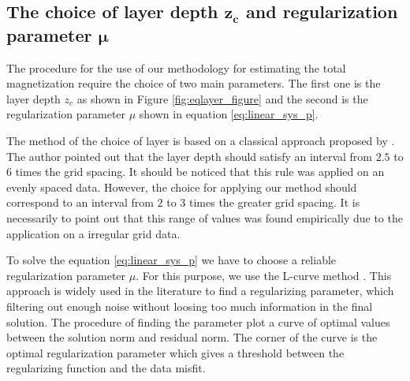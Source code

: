 \subsection{The choice of layer depth $\mathbf{z_{c}}$ and regularization parameter $\mathbf{\mu}$}

The procedure for the use of our methodology for estimating the total magnetization require the choice of two main parameters. The first one is the layer depth $z_c$ as shown in Figure \ref{fig:eqlayer_figure} and the second is the regularization parameter $\mu$ shown in equation \ref{eq:linear_sys_p}.

The method of the choice of layer is based on a classical approach proposed by \cite{dampney1969}. The author pointed out that the layer depth should satisfy an interval from $2.5$ to $6$ times the grid spacing. It should be noticed that this rule was applied on an evenly spaced data. However, the choice for applying our method should correspond to an interval from $2$ to $3$ times the greater grid spacing. It is necessarily to point out that this range of values was found empirically due to the application on a irregular grid data.

To solve the equation \ref{eq:linear_sys_p} we have to choose a reliable regularization parameter $\mu$. For this purpose, we use the L-curve method \citep{hansen1992}. This approach is widely used in the literature to find a regularizing parameter, which filtering out enough noise without loosing too much information in the final solution. The procedure of finding the parameter plot a curve of optimal values between the solution norm and residual norm. The corner of the curve is the optimal regularization parameter which gives a threshold between the regularizing function and the data misfit.
